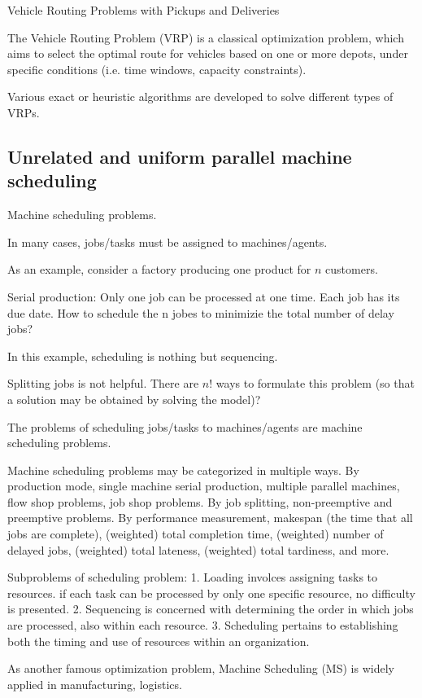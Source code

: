 \documentclass[preprint,12pt,authoryear]{elsarticle}
\begin{document}
Vehicle Routing Problems with Pickups and Deliveries

The Vehicle Routing Problem (VRP) is a classical optimization problem, 
which aims to select the optimal route for vehicles based on one or more depots,
under specific conditions (i.e. time windows, capacity constraints).

Various exact or heuristic algorithms are developed to solve different types of VRPs.

\subsection{Unrelated and uniform parallel machine scheduling}

Machine scheduling problems.

In many cases, jobs/tasks must be assigned to machines/agents.

As an example, consider a factory producing one product for $n$ customers. 

Serial production: Only one job can be processed at one time.
Each job has its due date.
How to schedule the n jobes to minimizie the total number of delay jobs?

In this example, scheduling is nothing but sequencing.

Splitting jobs is not helpful.
There are $n!$ ways to formulate this problem 
(so that a solution may be obtained by solving the model)?

The problems of scheduling jobs/tasks to 
machines/agents are machine scheduling problems.

Machine scheduling problems may be categorized in multiple ways. 
By production mode, 
single machine serial production, 
multiple parallel machines, 
flow shop problems,
job shop problems.
By job splitting,
non-preemptive and preemptive problems.
By performance measurement, 
makespan (the time that all jobs are complete),
(weighted) total completion time,
(weighted) number of delayed jobs,
(weighted) total lateness,
(weighted) total tardiness,
and more.

Subproblems of scheduling problem: 
1. Loading involces assigning tasks to resources. 
if each task can be processed by only one specific resource, no difficulty is presented. 
2. Sequencing is concerned with determining the order in which jobs are processed, 
also within each resource.
3. Scheduling pertains to establishing both the 
timing and use of resources within an organization.

As another famous optimization problem, Machine Scheduling (MS) 
is widely applied in manufacturing, logistics.
\end{document}
